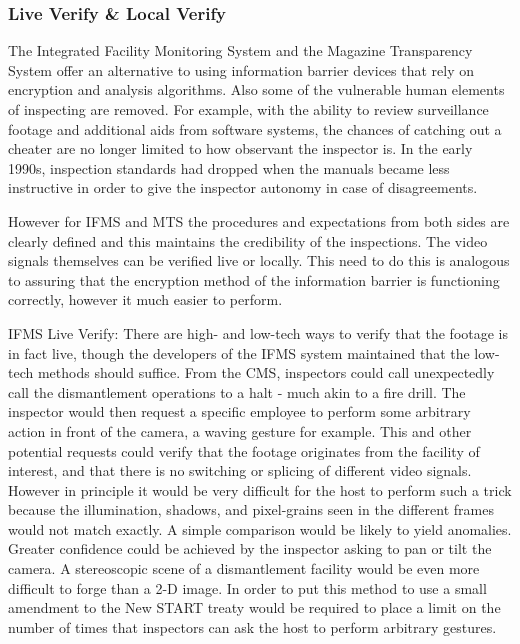 \documentclass[twoside,titlepage,11pt,twocolumn,a4paper]{article}
\begin{document}
\subsubsection{Live Verify \& Local Verify}
The Integrated Facility Monitoring System and the Magazine Transparency 
System offer an alternative to using information barrier devices 
that rely on encryption and analysis algorithms. Also some of the 
vulnerable human elements of inspecting are removed. For example, 
with the ability to review surveillance footage and additional aids 
from software systems, the chances of catching out a cheater are no 
longer limited to how observant the inspector is.  In the early 1990s, 
inspection standards had dropped when the manuals became less 
instructive in order to give the inspector autonomy in case of 
disagreements. \citep{welch2008}

However for IFMS and MTS the procedures and expectations from both 
sides are clearly defined and this maintains the credibility of the 
inspections. The video signals themselves can be verified live or 
locally. This need to do this is analogous to assuring that the 
encryption method of the information barrier is functioning 
correctly, however it much easier to perform.

IFMS Live Verify: There are high- and low-tech ways to verify 
that the footage is in fact live, though the developers of the 
IFMS system maintained that the low-tech methods should suffice. 
From the CMS, inspectors could call unexpectedly call the 
dismantlement operations to a halt - much akin to a fire drill. 
The inspector would then request a specific employee to perform 
some arbitrary action in front of the camera, a waving gesture 
for example. This and other potential requests could verify that 
the footage originates from the facility of interest, and that 
there is no switching or splicing of different video signals. 
However in principle it would be very difficult for the host 
to perform such a trick because the illumination, shadows, 
and pixel-grains seen in the different frames would not match 
exactly. A simple comparison would be likely to yield anomalies. 
Greater confidence could be achieved by the inspector asking 
to pan or tilt the camera. A stereoscopic scene of a dismantlement 
facility would be even more difficult to forge than a 2-D image.  
In order to put this method to use a small amendment to the New 
START treaty would be required to place a limit on the number 
of times that inspectors can ask the host to perform arbitrary 
gestures. 
\end{document}
